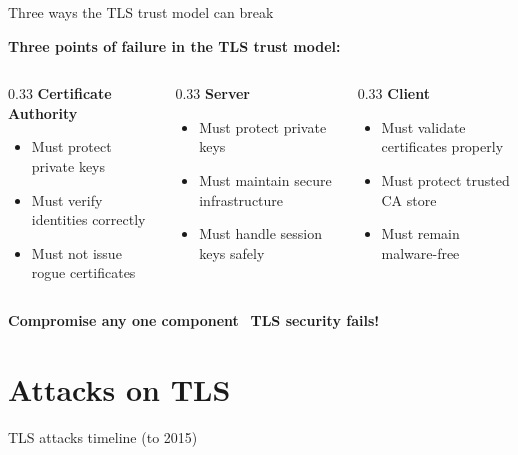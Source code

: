 \ifdefined\PRESENTATION\else\PassOptionsToClass{handout}{beamer}\fi\documentclass[aspectratio=169, lualatex]{beamer}
\begin{document}
\begin{frame}{Three ways the TLS trust model can break}
	\begin{center}
		\textbf{Three points of failure in the TLS trust model:}
	\end{center}
	\begin{columns}[c]
		\begin{column}{0.33\textwidth}
			\textbf{Certificate Authority}
			\begin{itemize}
				\item Must protect private keys
				\item Must verify identities correctly
				\item Must not issue rogue certificates
			\end{itemize}
		\end{column}
		\begin{column}{0.33\textwidth}
			\textbf{Server}
			\begin{itemize}
				\item Must protect private keys
				\item Must maintain secure infrastructure
				\item Must handle session keys safely
			\end{itemize}
		\end{column}
		\begin{column}{0.33\textwidth}
			\textbf{Client}
			\begin{itemize}
				\item Must validate certificates properly
				\item Must protect trusted CA store
				\item Must remain malware-free
			\end{itemize}
		\end{column}
	\end{columns}
	\pause
	\begin{center}
		\textbf{Compromise any one component} \rightarrow\ \textbf{TLS security fails!}
	\end{center}
\end{frame}

\section{Attacks on TLS}

\begin{frame}{TLS attacks timeline (to 2015)}
\end{frame}
\end{document}
